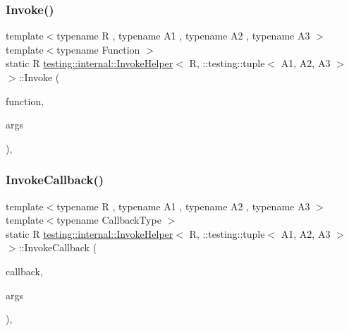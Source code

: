 \subsubsection{\texorpdfstring{Invoke()}{Invoke()}}
{\footnotesize\ttfamily template$<$typename R , typename A1 , typename A2 , typename A3 $>$ \\
template$<$typename Function $>$ \\
static R \mbox{\hyperlink{classtesting_1_1internal_1_1InvokeHelper}{testing\+::internal\+::\+Invoke\+Helper}}$<$ R, \+::testing\+::tuple$<$ A1, A2, A3 $>$ $>$\+::Invoke (\begin{DoxyParamCaption}\item[{\mbox{\hyperlink{structtesting_1_1internal_1_1Function}{Function}}}]{function,  }\item[{const \+::testing\+::tuple$<$ A1, A2, A3 $>$ \&}]{args }\end{DoxyParamCaption})\hspace{0.3cm}{\ttfamily [inline]}, {\ttfamily [static]}}

\mbox{\label{classtesting_1_1internal_1_1InvokeHelper_3_01R_00_01_1_1testing_1_1tuple_3_01A1_00_01A2_00_01A3_01_4_01_4_a4b2b3002d1c4a9b0891568bdd4da1a87}} 
\subsubsection{\texorpdfstring{InvokeCallback()}{InvokeCallback()}}
{\footnotesize\ttfamily template$<$typename R , typename A1 , typename A2 , typename A3 $>$ \\
template$<$typename Callback\+Type $>$ \\
static R \mbox{\hyperlink{classtesting_1_1internal_1_1InvokeHelper}{testing\+::internal\+::\+Invoke\+Helper}}$<$ R, \+::testing\+::tuple$<$ A1, A2, A3 $>$ $>$\+::Invoke\+Callback (\begin{DoxyParamCaption}\item[{Callback\+Type $\ast$}]{callback,  }\item[{const \+::testing\+::tuple$<$ A1, A2, A3 $>$ \&}]{args }\end{DoxyParamCaption})\hspace{0.3cm}{\ttfamily [inline]}, {\ttfamily [static]}}

